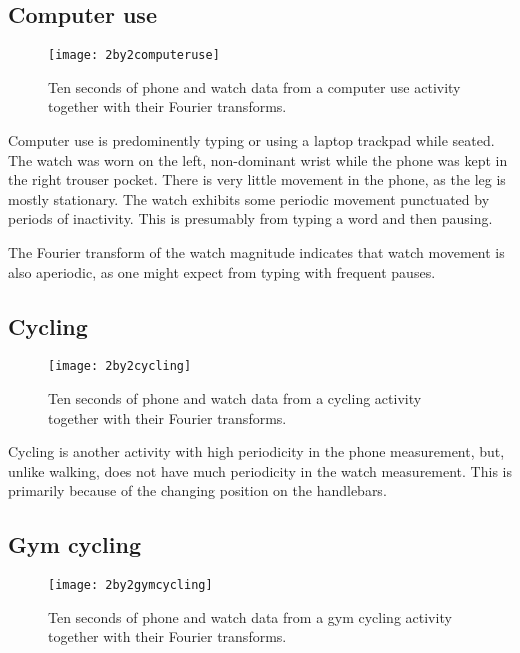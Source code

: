       
    \pagebreak[4]
    \subsection{Computer use}
      \begin{figure}[!th]
        \centering
        \texttt{[image: 2by2computeruse]}
        \caption[Computer use sample]{Ten seconds of phone and watch data from a computer use activity together with their Fourier transforms.}
        \label{fig:2by2computeruse}
      \end{figure}
      
      Computer use is predominently typing or using a laptop trackpad while seated. The watch was worn on the left, non-dominant wrist while the phone was kept in the right trouser pocket. There is very little movement in the phone, as the leg is mostly stationary. The watch exhibits some periodic movement punctuated by periods of inactivity. This is presumably from typing a word and then pausing.
      
      The Fourier transform of the watch magnitude indicates that watch movement is also aperiodic, as one might expect from typing with frequent pauses. 
    \pagebreak[4]
    \subsection{Cycling}
      \begin{figure}[!th]
        \centering
        \texttt{[image: 2by2cycling]}
        \caption[Cycling sample]{Ten seconds of phone and watch data from a cycling activity together with their Fourier transforms.}
        \label{fig:2by2cycling}
      \end{figure}
      Cycling is another activity with high periodicity in the phone measurement, but, unlike walking, does not have much periodicity in the watch measurement. This is primarily because of the changing position on the handlebars.
    \pagebreak[4]
    \subsection{Gym cycling}
      \begin{figure}[!th]
        \centering
        \texttt{[image: 2by2gymcycling]}
        \caption[Gym cycling sample]{Ten seconds of phone and watch data from a gym cycling activity together with their Fourier transforms.}
        \label{fig:2by2gymcycling}
      \end{figure}
      
